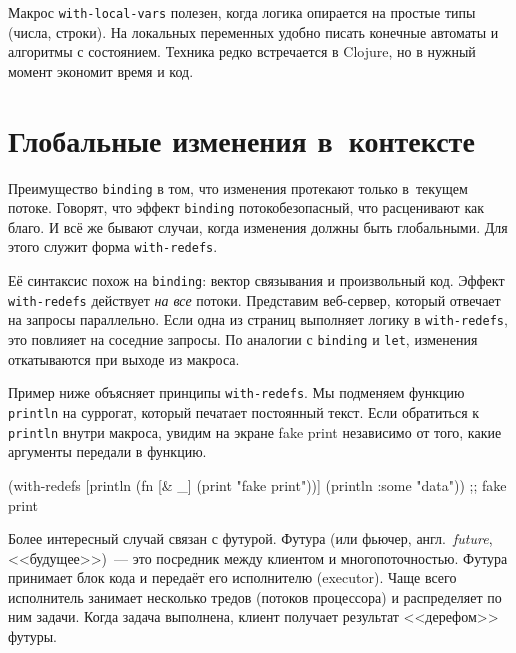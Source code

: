 \fi

Макрос \verb|with-local-vars| полезен, когда логика опирается на простые типы
(числа, строки). На локальных переменных удобно писать конечные автоматы и
алгоритмы с состоянием. Техника редко встречается в Clojure, но в нужный момент
экономит время и код.

\section{Глобальные изменения в~контексте}


\label{with-redefs}

Преимущество \verb|binding| в том, что изменения протекают только в~текущем
потоке. Говорят, что эффект \verb|binding| потокобезопасный, что расценивают
как благо. И всё же бывают случаи, когда изменения должны быть глобальными. Для
этого служит форма \verb|with-redefs|.

Её синтаксис похож на \verb|binding|: вектор связывания и произвольный
код. Эффект \verb|with-redefs| действует \emph{на все} потоки. Представим
веб-сервер, который отвечает на запросы параллельно. Если одна из страниц
выполняет логику в \verb|with-redefs|, это повлияет на соседние
запросы. По аналогии с \verb|binding| и \verb|let|, изменения откатываются при
выходе из макроса.

Пример ниже объясняет принципы \texttt{with\--re\-defs}. Мы подменяем функцию
\verb|println| на суррогат, который печатает постоянный текст. Если обратиться к
\verb|println| внутри макроса, увидим на экране fake print независимо от того,
какие аргументы передали в функцию.

\begin{english}
  \begin{clojure}
(with-redefs [println
              (fn [& _]
                (print "fake print\n"))]
  (println {:some "data"}))
;; fake print
  \end{clojure}
\end{english}


Более интересный случай связан с футурой. Футура (или фьючер,
англ.~\emph{future}, <<будущее>>)~--- это посредник между клиентом и
многопоточностью. Футура принимает блок кода и передаёт его исполнителю
(executor). Чаще всего исполнитель занимает несколько тредов (потоков
процессора) и распределяет по ним задачи. Когда задача выполнена, клиент
получает результат <<дерефом>> футуры.


